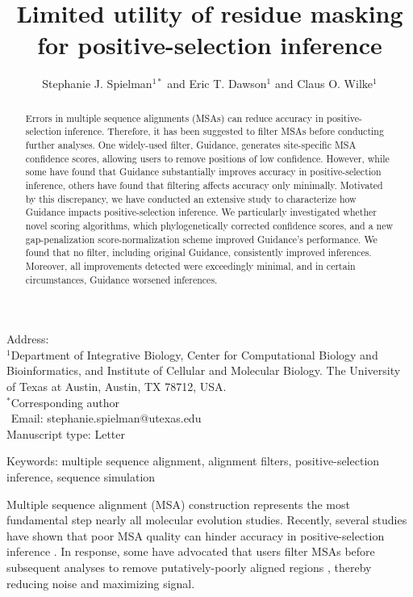 \documentclass[11pt]{article}
\begin{document}
\title{\textbf{Limited utility of residue masking for positive-selection inference}}
\author{Stephanie J. Spielman$^{1*}$ and Eric T. Dawson$^{1}$ and Claus O. Wilke$^{1}$}
\date{}

\maketitle
\noindent
Address:\\
$^1$Department of Integrative Biology, Center for Computational Biology and Bioinformatics, and Institute of Cellular and Molecular Biology.
The University of Texas at Austin, Austin, TX 78712, USA.\\

\bigskip
\noindent
$^*$Corresponding author\\
$\phantom{^*}$Email: stephanie.spielman@utexas.edu\\

\bigskip
\noindent
Manuscript type: Letter

\bigskip
\noindent Keywords: multiple sequence alignment, alignment filters, positive-selection inference, sequence simulation

\newpage
\begin{abstract}
Errors in multiple sequence alignments (MSAs) can reduce accuracy in positive-selection inference. Therefore, it has been suggested to filter MSAs before conducting further analyses. One widely-used filter, Guidance, generates site-specific MSA confidence scores, allowing users to remove positions of low confidence. However, while some have found that Guidance substantially improves accuracy in positive-selection inference, others have found that filtering affects accuracy only minimally. Motivated by this discrepancy, we have conducted an extensive study to characterize how Guidance impacts positive-selection inference. We particularly investigated whether novel scoring algorithms, which phylogenetically corrected confidence scores, and a new gap-penalization score-normalization scheme improved Guidance's performance. We found that no filter, including original Guidance, consistently improved inferences. Moreover, all improvements detected were exceedingly minimal, and in certain circumstances, Guidance worsened inferences.
\end{abstract}



Multiple sequence alignment (MSA) construction represents the most fundamental step nearly all molecular evolution studies. Recently, several studies have shown that poor MSA quality can hinder accuracy in positive-selection inference \citep{Schneider2009, Fletcher2010, MarkovaRaina2011}. In response, some have advocated that users filter MSAs before subsequent analyses to remove putatively-poorly aligned regions \citep{Privman2012,Jordan2012}, thereby reducing noise and maximizing signal.
\end{document}

